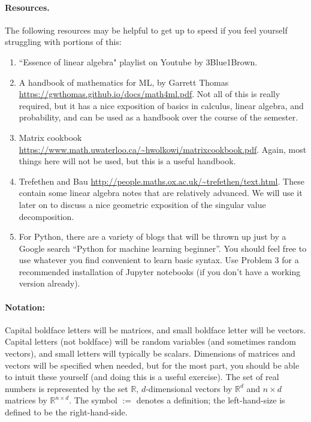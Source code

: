 \documentclass[11pt,twoside]{article}
\begin{document}
\paragraph{Resources.} The following resources may be helpful to get up to speed if you feel yourself struggling with portions of this:
\begin{enumerate}
        \item ``Essence of linear algebra" playlist on Youtube by 3Blue1Brown.
        \item A handbook of mathematics for ML, by Garrett Thomas \sloppy \mbox{\url{https://gwthomas.github.io/docs/math4ml.pdf}}. Not all of this is really required, but it has a nice exposition of basics in calculus, linear algebra, and probability, and can be used as a handbook over the course of the semester.
        \item Matrix cookbook \url{https://www.math.uwaterloo.ca/~hwolkowi/matrixcookbook.pdf}. Again, most things here will not be used, but this is a useful handbook.
        \item Trefethen and Bau \url{http://people.maths.ox.ac.uk/~trefethen/text.html}. These contain some linear algebra notes that are relatively advanced. We will use it later on to discuss a nice geometric exposition of the singular value decomposition.
        \item For Python, there are a variety of blogs that will be thrown up just by a Google search ``Python for machine learning beginner''. You should feel free to use whatever you find convenient to learn basic syntax.  
        Use Problem 3 for a recommended installation of Jupyter notebooks (if you don't have a working version already).
\end{enumerate}
\paragraph{Notation:} Capital boldface letters will be matrices, and small boldface letter will be vectors. Capital letters (not boldface) will be random variables (and sometimes random vectors), and small letters will typically be scalars. 
Dimensions of matrices and vectors will be specified when needed, but for the most part, you should be able to intuit these yourself (and doing this is a useful exercise).
The set of real numbers is represented by the set $\mathbb{R}$, $d$-dimensional vectors by $\mathbb{R}^d$ and $n \times d$ matrices by $\mathbb{R}^{n \times d}$.
The symbol $:=$ denotes a definition; the left-hand-size is defined to be the right-hand-side.
\end{document}
